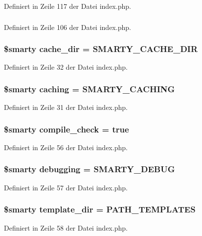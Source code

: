 Definiert in Zeile 117 der Datei index.php.
\subsubsection{}\label{index_8php_91cf6fbebedd86150a36e5ac3d5d3bfc}




Definiert in Zeile 106 der Datei index.php.
\subsubsection{\setlength{\rightskip}{0pt plus 5cm}\$smarty {\bf cache\_\-dir} = {\bf SMARTY\_\-CACHE\_\-DIR}}\label{index_8php_185e462e92160da1d68eed4d91eb32bb}




Definiert in Zeile 32 der Datei index.php.
\subsubsection{\setlength{\rightskip}{0pt plus 5cm}\$smarty {\bf caching} = {\bf SMARTY\_\-CACHING}}\label{index_8php_caaff3c02ea8ad8cb3d1e34a9c0a29e9}




Definiert in Zeile 31 der Datei index.php.
\subsubsection{\setlength{\rightskip}{0pt plus 5cm}\$smarty {\bf compile\_\-check} = true}\label{index_8php_160ced53880d9983f99956b729e6f78a}




Definiert in Zeile 56 der Datei index.php.
\subsubsection{\setlength{\rightskip}{0pt plus 5cm}\$smarty {\bf debugging} = {\bf SMARTY\_\-DEBUG}}\label{index_8php_ea9d5e8f56bbeab9291d94598d0eddb3}




Definiert in Zeile 57 der Datei index.php.
\subsubsection{\setlength{\rightskip}{0pt plus 5cm}\$smarty {\bf template\_\-dir} = {\bf PATH\_\-TEMPLATES}}\label{index_8php_9d273470cd8c82a3478336fb706cda8c}




Definiert in Zeile 58 der Datei index.php.